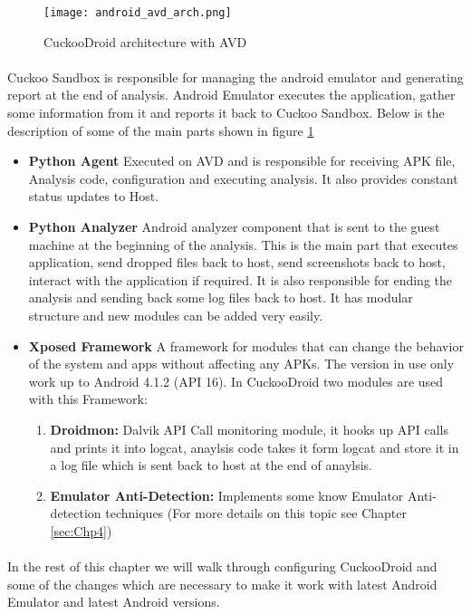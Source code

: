 \documentclass[../main.tex]{subfile}
\begin{document}
		\begin{figure}
			\texttt{[image: android\_avd\_arch.png]}
			\caption{CuckooDroid architecture with AVD}
			\label{fig:cuckoodroid_avd_arch}
		\end{figure}
		
		\paragraph{} Cuckoo Sandbox is responsible for managing the android emulator and generating report at the end of analysis. Android Emulator executes the application, gather some information from it and reports it back to Cuckoo Sandbox. Below is the description of some of the main parts shown in figure \ref{fig:cuckoodroid_avd_arch}
		\begin{itemize}
			\item \textbf{Python Agent} Executed on AVD and is responsible for receiving APK file, Analysis code, configuration and executing analysis. It also provides constant status updates to Host.
			\item \textbf{Python Analyzer} Android analyzer component that is sent to the guest machine at the beginning of the analysis. This is the main part that executes application, send dropped files back to host, send screenshots back to host, interact with the application if required. It is also responsible for ending the analysis and sending back some log files back to host. It has modular structure and new modules can be added very easily.
			\item \textbf{Xposed Framework} A framework for modules that can change the behavior of the system and apps without affecting any APKs. The version in use only work up to Android 4.1.2 (API 16). In CuckooDroid two modules are used with this Framework:
			\begin{enumerate}

				\item \textbf{Droidmon:} Dalvik  API Call monitoring module, it hooks up API calls and prints it into logcat, anaylsis code takes it form logcat and store it in a log file which is sent back to host at the end of anaylsis.
				\item \textbf{Emulator Anti-Detection:} Implements some know Emulator Anti-detection techniques (For more details on this topic see Chapter \ref{sec:Chp4})
			\end{enumerate}
		\end{itemize}
		\paragraph{} In the rest of this chapter we will walk through configuring CuckooDroid and some of the changes which are necessary to make it work with latest Android Emulator and latest Android versions.
\end{document}
